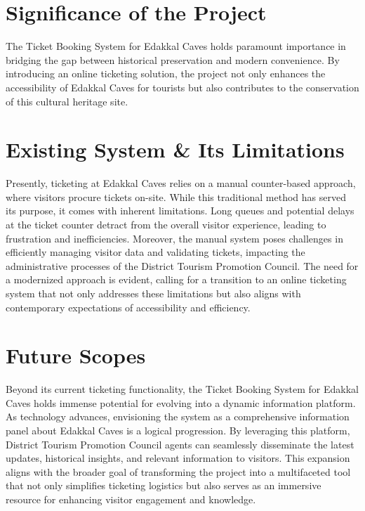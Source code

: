 \documentclass[12pt,a4paper]{report}
\begin{document}
\section{Significance of the Project}

The Ticket Booking System for Edakkal Caves holds paramount importance in bridging the gap between historical preservation and modern convenience. By introducing an online ticketing solution, the project not only enhances the accessibility of Edakkal Caves for tourists but also contributes to the conservation of this cultural heritage site.

\section{Existing System \& Its Limitations}

Presently, ticketing at Edakkal Caves relies on a manual counter-based approach, where visitors procure tickets on-site. While this traditional method has served its purpose, it comes with inherent limitations. Long queues and potential delays at the ticket counter detract from the overall visitor experience, leading to frustration and inefficiencies. Moreover, the manual system poses challenges in efficiently managing visitor data and validating tickets, impacting the administrative processes of the District Tourism Promotion Council. The need for a modernized approach is evident, calling for a transition to an online ticketing system that not only addresses these limitations but also aligns with contemporary expectations of accessibility and efficiency.

\section{Future Scopes}

Beyond its current ticketing functionality, the Ticket Booking System for Edakkal Caves holds immense potential for evolving into a dynamic information platform. As technology advances, envisioning the system as a comprehensive information panel about Edakkal Caves is a logical progression. By leveraging this platform, District Tourism Promotion Council agents can seamlessly disseminate the latest updates, historical insights, and relevant information to visitors. This expansion aligns with the broader goal of transforming the project into a multifaceted tool that not only simplifies ticketing logistics but also serves as an immersive resource for enhancing visitor engagement and knowledge.
\end{document}

